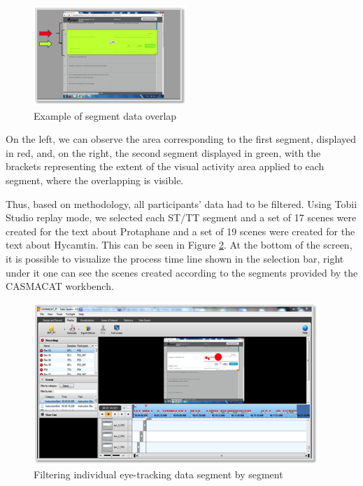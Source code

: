 \documentclass[output=paper]{langsci/langscibook}
\begin{document}
  
\begin{figure}
 \includegraphics[width=\textwidth]{figures/Sarto4.png}
 \caption{Example of segment data overlap}
 \label{sarto:fig:4}
\end{figure} 


On the left, we can observe the area corresponding to the first segment, displayed in red, and, on the right, the second segment displayed in green, with the brackets representing the extent of the visual activity area applied to each segment, where the overlapping is visible. 



Thus, based on \citet{alves2012} methodology, all participants’ data had to be filtered. Using Tobii Studio replay mode, we selected each ST/TT segment and a set of 17 scenes were created for the text about Protaphane and a set of 19 scenes were created for the text about Hycamtin. This can be seen in Figure \ref{sarto:fig:5}.  At the bottom of the screen, it is possible to visualize the process time line shown in the selection bar, right under it one can see the scenes created according to the segments provided by the CASMACAT workbench. 


\begin{figure}
 \includegraphics[width=\textwidth]{figures/Sarto5.png}
 \caption{Filtering individual eye-tracking data segment by segment}
 \label{sarto:fig:5}
\end{figure} 
\end{document}
